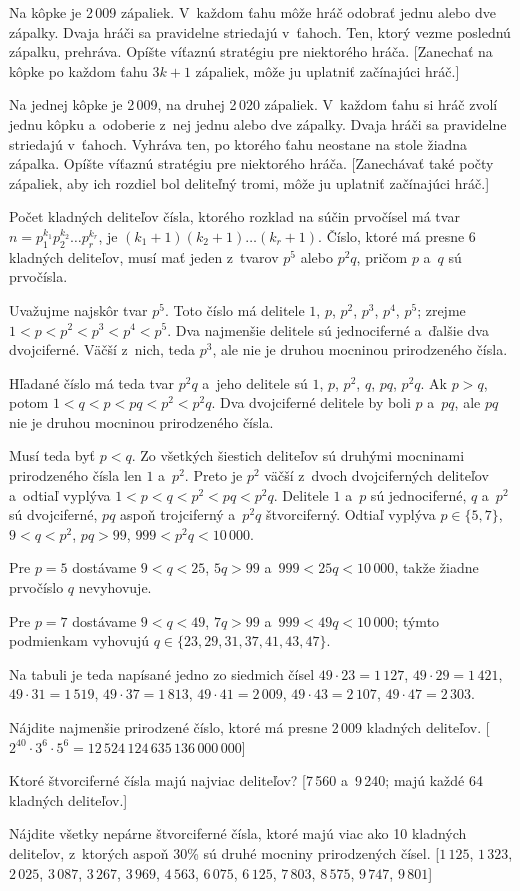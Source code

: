 {Na kôpke je 2\,009 zápaliek. V~každom ťahu môže hráč odobrať jednu alebo dve zápalky. Dvaja hráči sa pravidelne striedajú v~ťahoch. Ten, ktorý vezme poslednú zápalku, prehráva. Opíšte víťaznú stratégiu pre niektorého hráča. [Zanechať na kôpke po každom ťahu $3k+1$ zápaliek, môže ju uplatniť začínajúci hráč.]

\D
Na jednej kôpke je 2\,009, na druhej 2\,020 zápaliek. V~každom ťahu si hráč zvolí jednu kôpku a~odoberie z~nej jednu alebo dve zápalky. Dvaja hráči sa pravidelne striedajú v~ťahoch. Vyhráva ten, po ktorého ťahu neostane na stole žiadna zápalka. Opíšte víťaznú stratégiu pre niektorého hráča.
[Zanechávať také počty zápaliek, aby ich rozdiel bol deliteľný tromi, môže ju uplatniť začínajúci hráč.]
}

{%
Počet kladných deliteľov čísla, ktorého rozklad na súčin prvočísel má tvar $n=p_1^{k_1}p_2^{k_2}\dots p_r^{k_r}$, je $(k_1+1)(k_2+1)\dots(k_r+1)$. Číslo, ktoré má presne 6 kladných deliteľov, musí mať jeden z~tvarov $p^5$ alebo $p^2q$, pričom $p$ a~$q$ sú prvočísla.

Uvažujme najskôr tvar $p^5$. Toto číslo má delitele $1$, $p$, $p^2$, $p^3$, $p^4$, $p^5$; zrejme $1<p<p^2<p^3<p^4<p^5$. Dva najmenšie delitele sú jednociferné a~ďalšie dva dvojciferné. Väčší z~nich, teda $p^3$, ale nie je druhou mocninou prirodzeného čísla.

Hľadané číslo má teda tvar $p^2q$ a~jeho delitele sú $1$, $p$, $p^2$, $q$, $pq$, $p^2q$. Ak $p>q$, potom $1<q<p<pq<p^2<p^2q$. Dva dvojciferné delitele by boli $p$ a~$pq$, ale $pq$ nie je druhou mocninou prirodzeného čísla.

Musí teda byť $p<q$. Zo všetkých šiestich deliteľov sú druhými mocninami prirodzeného čísla len $1$ a~$p^2$. Preto je $p^2$ väčší z~dvoch dvojciferných deliteľov a~odtiaľ vyplýva $1<p<q<p^2<pq<p^2q$. Delitele $1$ a~$p$ sú jednociferné, $q$ a~$p^2$ sú dvojciferné, $pq$ aspoň trojciferný a~$p^2q$ štvorciferný. Odtiaľ vyplýva $p\in\{5,7\}$, $9<q<p^2$, $pq>99$, $999<p^2q<10\,000$.

Pre $p=5$ dostávame $9<q<25$, $5q>99$ a~$999<25q<10\,000$, takže žiadne prvočíslo $q$ nevyhovuje.

Pre $p=7$ dostávame $9<q<49$, $7q>99$ a~$999<49q<10\,000$; týmto podmienkam vyhovujú $q\in\{23,29,31,37,41,43,47\}$.

Na tabuli je teda napísané jedno zo siedmich čísel $49\cdot23=1\,127$, $49\cdot29=1\,421$, $49\cdot31=1\,519$, $49\cdot37=1\,813$, $49\cdot41=2\,009$, $49\cdot43=2\,107$, $49\cdot47=2\,303$.

Nájdite najmenšie prirodzené číslo, ktoré má presne 2\,009 kladných deliteľov.
[$2^{40}\cdot3^6\cdot5^6=12\,524\,124\,635\,136\,000\,000$]

Ktoré štvorciferné čísla majú najviac deliteľov?
[7\,560 a~9\,240; majú každé 64 kladných deliteľov.]

\D
Nájdite všetky nepárne štvorciferné čísla, ktoré majú viac ako 10 kladných deliteľov, z~ktorých aspoň 30\% sú druhé mocniny prirodzených čísel.
[$1\,125$, $1\,323$, $2\,025$, $3\,087$, $3\,267$, $3\,969$, $4\,563$, $6\,075$, $6\,125$, $7\,803$, $8\,575$, $9\,747$, $9\,801$]
}

